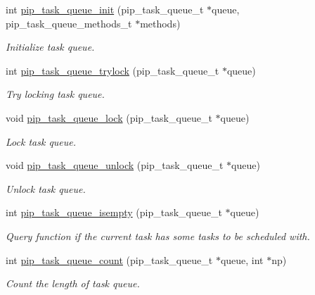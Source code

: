 \documentclass[twoside]{book}
\begin{document}
\begin{DoxyCompactItemize}
\item 
int \hyperlink{group__ulp-1-task-queue_ga9c50d9b2b810d97a75a5fe9c332902e0}{pip\-\_\-task\-\_\-queue\-\_\-init} (pip\-\_\-task\-\_\-queue\-\_\-t $\ast$queue, pip\-\_\-task\-\_\-queue\-\_\-methods\-\_\-t $\ast$methods)
\begin{DoxyCompactList}\small\item\em Initialize task queue. \end{DoxyCompactList}\item 
int \hyperlink{group__ulp-1-task-queue_ga20d50746c585f1ede68f2c9aefc39a5c}{pip\-\_\-task\-\_\-queue\-\_\-trylock} (pip\-\_\-task\-\_\-queue\-\_\-t $\ast$queue)
\begin{DoxyCompactList}\small\item\em Try locking task queue. \end{DoxyCompactList}\item 
void \hyperlink{group__ulp-1-task-queue_gaf7f6e26e29752a148704108bdcc7756f}{pip\-\_\-task\-\_\-queue\-\_\-lock} (pip\-\_\-task\-\_\-queue\-\_\-t $\ast$queue)
\begin{DoxyCompactList}\small\item\em Lock task queue. \end{DoxyCompactList}\item 
void \hyperlink{group__ulp-1-task-queue_gaf4cfe9905f1862718f65ba2fda961b84}{pip\-\_\-task\-\_\-queue\-\_\-unlock} (pip\-\_\-task\-\_\-queue\-\_\-t $\ast$queue)
\begin{DoxyCompactList}\small\item\em Unlock task queue. \end{DoxyCompactList}\item 
int \hyperlink{group__ulp-1-task-queue_gabf772cd5ea121458291801a26dea5c9d}{pip\-\_\-task\-\_\-queue\-\_\-isempty} (pip\-\_\-task\-\_\-queue\-\_\-t $\ast$queue)
\begin{DoxyCompactList}\small\item\em Query function if the current task has some tasks to be scheduled with. \end{DoxyCompactList}\item 
int \hyperlink{group__ulp-1-task-queue_ga5a043af776eb89933bfc0a057790cc82}{pip\-\_\-task\-\_\-queue\-\_\-count} (pip\-\_\-task\-\_\-queue\-\_\-t $\ast$queue, int $\ast$np)
\begin{DoxyCompactList}\small\item\em Count the length of task queue. \end{DoxyCompactList}\item 

\end{DoxyCompactItemize}
\end{document}
